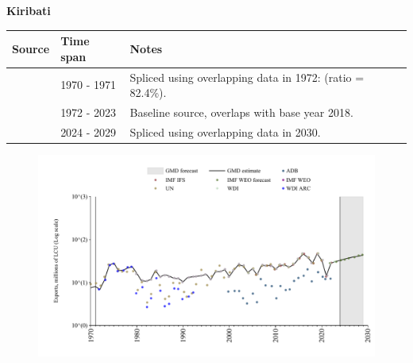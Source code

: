 \documentclass[12pt,a4paper,landscape]{article}
\begin{document}
\begin{adjustbox}{max totalsize={\paperwidth}{\paperheight},center}
\begin{minipage}[t][\textheight][t]{\textwidth}
\vspace*{0.5cm}
{}
\begin{center}
{\Large\bfseries Kiribati}
\end{center}
\vspace{0.5cm}
\begin{table}[H]
\centering
\small
\begin{tabular}{|l|l|l|}
\hline
\textbf{Source} & \textbf{Time span} & \textbf{Notes} \\
\hline
\rowcolor{white}\cite{UN}& 1970 - 1971 &Spliced using overlapping data in 1972: (ratio = 82.4\%).\\
\rowcolor{lightgray}\cite{WDI}& 1972 - 2023 &Baseline source, overlaps with base year 2018.\\
\rowcolor{white}\cite{IMF_WEO_forecast}& 2024 - 2029 &Spliced using overlapping data in 2030.\\
\hline
\end{tabular}
\end{table}
\begin{figure}[H]
\centering
\includegraphics[width=\textwidth,height=0.6\textheight,keepaspectratio]{graphs/KIR_exports.pdf}
\end{figure}
\end{minipage}
\end{adjustbox}
\end{document}
